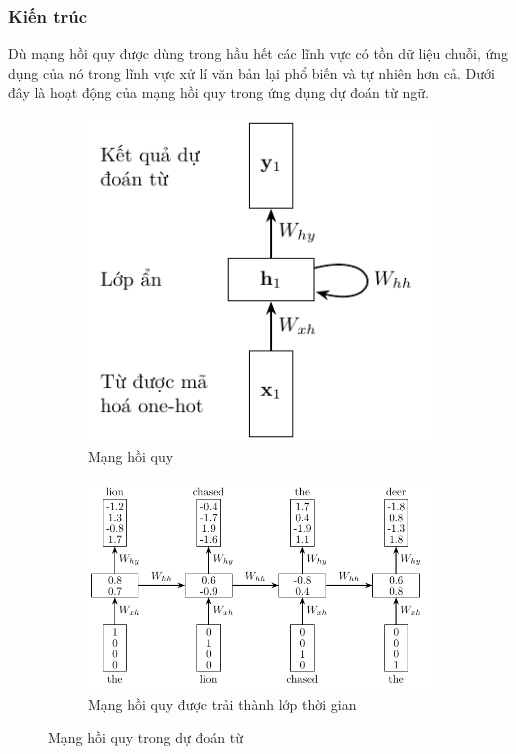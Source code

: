 \subsubsection{Kiến trúc}
Dù mạng hồi quy được dùng trong hầu hết các lĩnh vực có tồn dữ liệu chuỗi, ứng dụng của nó trong lĩnh vực xử lí văn bản lại phổ biến và tự nhiên hơn cả. Dưới đây là hoạt động của mạng hồi quy trong ứng dụng dự đoán từ ngữ.
\begin{figure}[htb]
    \centering
    \begin{subfigure}[t]{0.33\textwidth}
        \centering
        \includegraphics[width=\textwidth]{tikz_image/rnn_example_1a.pdf}
        \caption{Mạng hồi quy}
        \label{figure:rnn-example-a}
    \end{subfigure}
    \begin{subfigure}[t]{0.66\textwidth}
        \centering
        \includegraphics[width=\textwidth]{tikz_image/rnn_example_1b.pdf}
        \caption{Mạng hồi quy được trải thành lớp thời gian}
        \label{figure:rnn-example-b}
    \end{subfigure}
    \caption{Mạng hồi quy trong dự đoán từ \cite{Aggarwal2023-zk}}
    \label{figure:rnn-example}
\end{figure}

